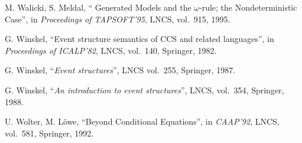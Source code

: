  M. Walicki, S. Meldal, `` Generated Models and the 
$\omega$-rule; the Nondeterministic Case'', in {\em Proceedings of 
TAPSOFT'95}, LNCS, vol.~915, 1995.

 G. Winskel, ``Event structure semantics of CCS and 
related languages'', in {\em Proceedings of ICALP'82}, LNCS, vol.~140, 
Springer, 1982.

 G. Winskel, ``{\em Event structures}'', LNCS vol.~255, Springer, 1987.

 G. Winskel, ``{\em An introduction to event 
structures}'', LNCS, vol.~354, Springer, 1988.

 U. Wolter, M. L\"{o}we, ``Beyond Conditional Equations'', 
in {\em CAAP'92}, LNCS, vol.~581, Springer, 1992.

